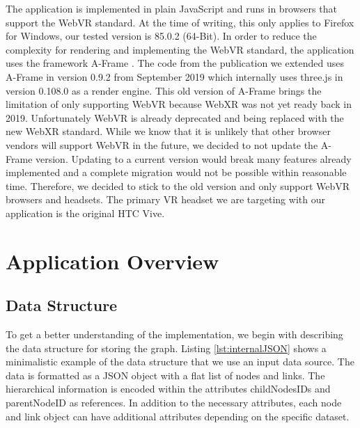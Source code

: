 The application is implemented in plain JavaScript and runs in browsers that support the WebVR standard. 
At the time of writing, this only applies to Firefox for Windows, our tested version is 85.0.2 (64-Bit). 
In order to reduce the complexity for rendering and implementing the WebVR standard, the application uses the framework A-Frame \cite{aframe}. The code from the publication we extended uses A-Frame in version 0.9.2 from September 2019 which internally uses three.js \cite{threejs} in version 0.108.0 as a render engine.
This old version of A-Frame brings the limitation of only supporting WebVR because WebXR was not yet ready back in 2019.
Unfortunately WebVR is already deprecated and being replaced with the new WebXR standard.
While we know that it is unlikely that other browser vendors will support WebVR in the future, we decided to not update the A-Frame version. Updating to a current version would break many features already implemented and a complete migration would not be possible within reasonable time. Therefore, we decided to stick to the old version and only support WebVR browsers and headsets.
The primary VR headset we are targeting with our application is the original HTC Vive.

\section{Application Overview}

\label{sec:applOverview}
\subsection{Data Structure}
\label{subSec:dataStruct}
To get a better understanding of the implementation, we begin with describing the data structure for storing the graph.
Listing \ref{lst:internalJSON} shows a minimalistic example of the data structure that we use an input data source. The data is formatted as a JSON object with a flat list of nodes and links. The hierarchical information is encoded within the attributes childNodesIDs and parentNodeID as references. 
In addition to the necessary attributes, each node and link object can have additional attributes depending on the specific dataset.
\pagebreak

